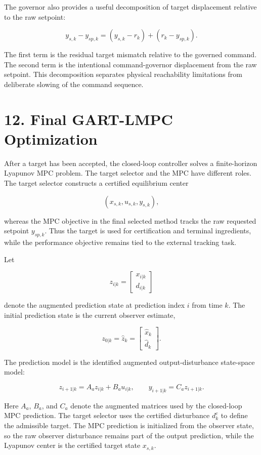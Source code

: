 \documentclass[11pt]{article}
\begin{document}
The governor also provides a useful decomposition of target displacement relative to the raw setpoint:


\[
y_{s,k}-y_{sp,k}
=
(y_{s,k}-r_k)
+
(r_k-y_{sp,k}).
\]

The first term is the residual target mismatch relative to the governed command. The second term is the intentional command-governor displacement from the raw setpoint. This decomposition separates physical reachability limitations from deliberate slowing of the command sequence.


\section*{12. Final GART-LMPC Optimization}

After a target has been accepted, the closed-loop controller solves a finite-horizon Lyapunov MPC problem. The target selector and the MPC have different roles. The target selector constructs a certified equilibrium center


\[
(x_{s,k},u_{s,k},y_{s,k}),
\]

whereas the MPC objective in the final selected method tracks the raw requested setpoint $y_{sp,k}$. Thus the target is used for certification and terminal ingredients, while the performance objective remains tied to the external tracking task.


Let


\[
z_{i|k}
=
\begin{bmatrix}
x_{i|k} \\
d_{i|k}
\end{bmatrix}
\]

denote the augmented prediction state at prediction index $i$ from time $k$. The initial prediction state is the current observer estimate,


\[
z_{0|k}=\hat z_k
=
\begin{bmatrix}
\hat x_k \\
\hat d_k
\end{bmatrix}.
\]

The prediction model is the identified augmented output-disturbance state-space model:


\[
z_{i+1|k}=A_a z_{i|k}+B_a u_{i|k},
\qquad
y_{i+1|k}=C_a z_{i+1|k}.
\]

Here $A_a$, $B_a$, and $C_a$ denote the augmented matrices used by the closed-loop MPC prediction. The target selector uses the certified disturbance $d^c_k$ to define the admissible target. The MPC prediction is initialized from the observer state, so the raw observer disturbance remains part of the output prediction, while the Lyapunov center is the certified target state $x_{s,k}$.
\end{document}

